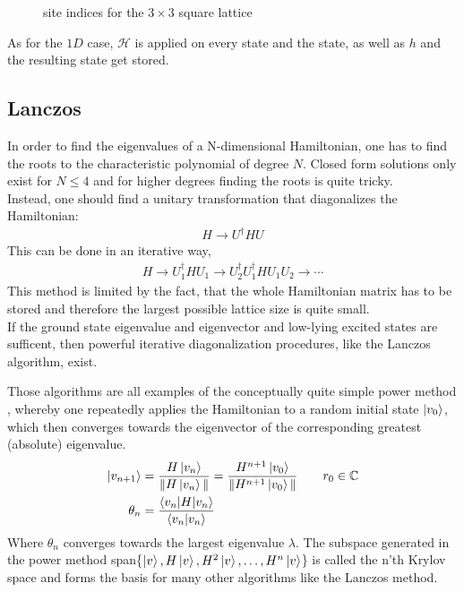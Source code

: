 \documentclass{article}
\begin{document}
\begin{figure}[htbp]
\centering
{}
\caption[]{\label{fig:1} site indices for the $3 \times 3$ square lattice}
\end{figure}
As for the $1D$ case, $\mathcal{H}$ is applied on every state and the
state, as well as $h$ and the resulting state get stored.



\subsection{Lanczos}
In order to find the eigenvalues of a N-dimensional Hamiltonian, one
has to find the roots to the characteristic polynomial of degree
$N$. Closed form solutions only exist for $ N\leq 4$ and for higher degrees
finding the roots is quite tricky.\\
Instead, one should find a unitary transformation that diagonalizes
the Hamiltonian:
\begin{align*}
H \to U^{\dagger} H U
\end{align*}
This can be done in an iterative way,
\begin{align*}
H \to U_1^{\dagger} H U_1 \to U_2^{\dagger}U_1^{\dagger} H U_1U_2 \to \dotsm
\end{align*}
This method is limited by the fact, that the whole Hamiltonian matrix
has to be stored and therefore the largest possible lattice size is
quite small.\\
If the ground state eigenvalue and eigenvector and low-lying excited
states are sufficent, then powerful iterative diagonalization
procedures, like the Lanczos algorithm, exist.

Those algorithms are all examples of the conceptually quite simple
power method \cite{Noack},
whereby one repeatedly applies the Hamiltonian to a random initial
state $\ket{v_0}$, which then converges towards the eigenvector of the
corresponding greatest (absolute) eigenvalue.
\begin{align*}
\ket{v_{n+1}} &= \frac{H \ket{v_n}}{\| H \ket{v_n} \|} =\frac{H^{n+1} \ket{v_0}}{\| H^{n+1} \ket{v_0} \|}  \qquad r_0 \in \mathbb{C}\\
\theta_n &= \frac{\braket{v_n|H|v_n}}{\braket{v_n|v_n}}
\end{align*}
Where $\theta_n$ converges towards the largest eigenvalue $\lambda$. The
subspace generated in the power method
 span\{$\ket{v},H \ket{v}, H^2 \ket{v}, \dotsc,H^n \ket{v}$\} 
is called the n'th Krylov space and forms the basis for many other
algorithms like the Lanczos method.
\end{document}
